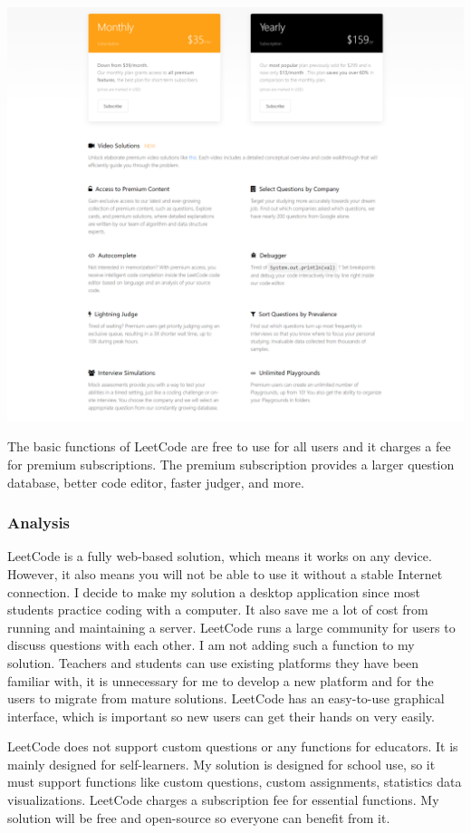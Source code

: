 \documentclass[a4paper]{report}
\begin{document}
\includegraphics[width=\linewidth]{LeetCode-Premium}

The basic functions of LeetCode are free to use for all users and it charges a fee for premium subscriptions. The premium subscription provides a larger question database, better code editor, faster judger, and more.

\subsubsection{Analysis}

LeetCode is a fully web-based solution, which means it works on any device. However, it also means you will not be able to use it without a stable Internet connection. I decide to make my solution a desktop application since most students practice coding with a computer. It also save me a lot of cost from running and maintaining a server. LeetCode runs a large community for users to discuss questions with each other. I am not adding such a function to my solution. Teachers and students can use existing platforms they have been familiar with, it is unnecessary for me to develop a new platform and for the users to migrate from mature solutions. LeetCode has an easy-to-use graphical interface, which is important so new users can get their hands on very easily.

LeetCode does not support custom questions or any functions for educators. It is mainly designed for self-learners. My solution is designed for school use, so it must support functions like custom questions, custom assignments, statistics data visualizations. LeetCode charges a subscription fee for essential functions. My solution will be free and open-source so everyone can benefit from it.
\end{document}
